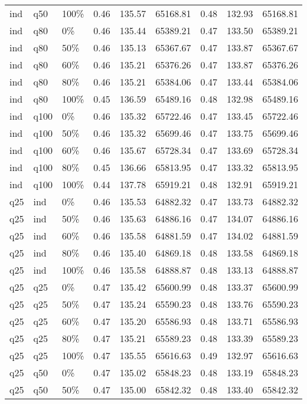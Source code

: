\begin{longtable}{lllrrrrrr}
  ind & q50 & 100\% & 0.46 & 135.57 & 65168.81 & 0.48 & 132.93 & 65168.81 \\ 
  ind & q80 & 0\% & 0.46 & 135.44 & 65389.21 & 0.47 & 133.50 & 65389.21 \\ 
  ind & q80 & 50\% & 0.46 & 135.13 & 65367.67 & 0.47 & 133.87 & 65367.67 \\ 
  ind & q80 & 60\% & 0.46 & 135.21 & 65376.26 & 0.47 & 133.87 & 65376.26 \\ 
  ind & q80 & 80\% & 0.46 & 135.21 & 65384.06 & 0.47 & 133.44 & 65384.06 \\ 
  ind & q80 & 100\% & 0.45 & 136.59 & 65489.16 & 0.48 & 132.98 & 65489.16 \\ 
  ind & q100 & 0\% & 0.46 & 135.32 & 65722.46 & 0.47 & 133.45 & 65722.46 \\ 
  ind & q100 & 50\% & 0.46 & 135.32 & 65699.46 & 0.47 & 133.75 & 65699.46 \\ 
  ind & q100 & 60\% & 0.46 & 135.67 & 65728.34 & 0.47 & 133.69 & 65728.34 \\ 
  ind & q100 & 80\% & 0.45 & 136.66 & 65813.95 & 0.47 & 133.32 & 65813.95 \\ 
  ind & q100 & 100\% & 0.44 & 137.78 & 65919.21 & 0.48 & 132.91 & 65919.21 \\ 
  q25 & ind & 0\% & 0.46 & 135.53 & 64882.32 & 0.47 & 133.73 & 64882.32 \\ 
  q25 & ind & 50\% & 0.46 & 135.63 & 64886.16 & 0.47 & 134.07 & 64886.16 \\ 
  q25 & ind & 60\% & 0.46 & 135.58 & 64881.59 & 0.47 & 134.02 & 64881.59 \\ 
  q25 & ind & 80\% & 0.46 & 135.40 & 64869.18 & 0.48 & 133.58 & 64869.18 \\ 
  q25 & ind & 100\% & 0.46 & 135.58 & 64888.87 & 0.48 & 133.13 & 64888.87 \\ 
  q25 & q25 & 0\% & 0.47 & 135.42 & 65600.99 & 0.48 & 133.37 & 65600.99 \\ 
  q25 & q25 & 50\% & 0.47 & 135.24 & 65590.23 & 0.48 & 133.76 & 65590.23 \\ 
  q25 & q25 & 60\% & 0.47 & 135.20 & 65586.93 & 0.48 & 133.71 & 65586.93 \\ 
  q25 & q25 & 80\% & 0.47 & 135.21 & 65589.23 & 0.48 & 133.39 & 65589.23 \\ 
  q25 & q25 & 100\% & 0.47 & 135.55 & 65616.63 & 0.49 & 132.97 & 65616.63 \\ 
  q25 & q50 & 0\% & 0.47 & 135.02 & 65848.23 & 0.48 & 133.19 & 65848.23 \\ 
  q25 & q50 & 50\% & 0.47 & 135.00 & 65842.32 & 0.48 & 133.40 & 65842.32 \\ 

\end{longtable}
